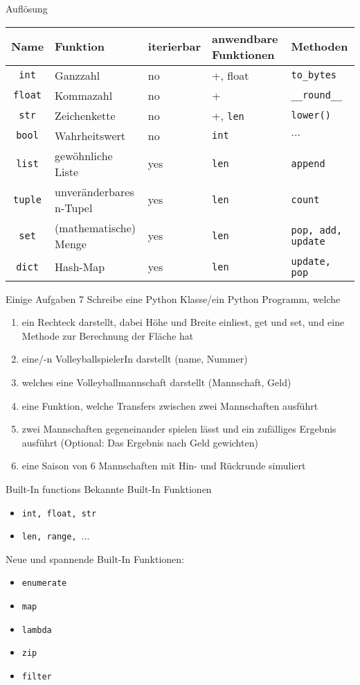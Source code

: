 \begin{frame}{Auflösung}
	\footnotesize
	\begin{tabular}{c|p{2cm}|l|l|l}
		Name & Funktion &iterierbar &anwendbare Funktionen &  Methoden\\ 
		\hline
		\texttt{int} & Ganzzahl &no& +, float&\texttt{to\_bytes}\\
		\texttt{float} & Kommazahl&no& +&\texttt{\_\_round\_\_}\\
		\texttt{str} & Zeichenkette &no& +, \texttt{len}&\texttt{lower()}\\
		\texttt{bool} & Wahrheitswert &no&\texttt{int}&$\dots$\\ 
		\hline
		\texttt{list} & gewöhnliche Liste &yes&\texttt{len}&\texttt{append}\\
		\texttt{tuple} & unveränderbares n-Tupel&yes&\texttt{len}&\texttt{count} \\
		\texttt{set} & (mathematische) Menge &yes&\texttt{len}&\texttt{pop, add, update}\\
		\texttt{dict} & Hash-Map &yes&\texttt{len}&\texttt{update, pop}\\
	\end{tabular}
\end{frame}

\begin{frame}{Einige Aufgaben 7}
	Schreibe eine Python Klasse/ein Python Programm, welche
	\begin{enumerate}
		\item ein Rechteck darstellt, dabei Höhe und Breite einliest, get und set, und eine Methode zur Berechnung der Fläche hat
		\item eine/-n VolleyballspielerIn darstellt (name, Nummer)
		\item welches eine Volleyballmannschaft darstellt (Mannschaft, Geld)
		\item eine Funktion, welche Transfers zwischen zwei Mannschaften ausführt
		\item zwei Mannschaften gegeneinander spielen lässt und ein zufälliges Ergebnis ausführt (Optional: Das Ergebnis nach Geld gewichten)
		\item eine Saison von 6 Mannschaften mit Hin- und Rückrunde simuliert
	\end{enumerate}
\end{frame}

\begin{frame}{Built-In functions}
	Bekannte Built-In Funktionen
	\begin{itemize}
		\item \texttt{int, float, str}
		\item \texttt{len, range, $\dots$}
	\end{itemize}
	\pause
	Neue und spannende Built-In Funktionen:
	\begin{itemize}
		\item \texttt{enumerate}
		\item \texttt{map}
		\item \texttt{lambda}
		\item \texttt{zip}
		\item \texttt{filter}
	\end{itemize}
\end{frame}

